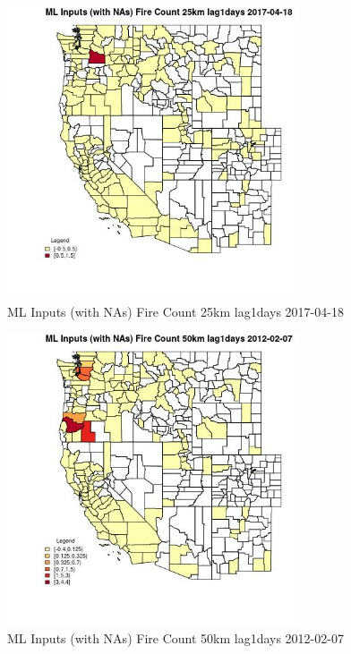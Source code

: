\begin{figure} 
\centering  
\includegraphics[width=0.77\textwidth]{Code_Outputs/Report_ML_input_PM25_Step4_part_f_de_duplicated_aves_prioritize_24hr_obswNAs_CountyFire_Count_25km_lag1daysMean2017-04-18.jpg} 
\caption{\label{fig:Report_ML_input_PM25_Step4_part_f_de_duplicated_aves_prioritize_24hr_obswNAsCountyFire_Count_25km_lag1daysMean2017-04-18}ML Inputs (with NAs) Fire Count 25km lag1days 2017-04-18} 
\end{figure} 
 

\clearpage 

\begin{figure} 
\centering  
\includegraphics[width=0.77\textwidth]{Code_Outputs/Report_ML_input_PM25_Step4_part_f_de_duplicated_aves_prioritize_24hr_obswNAs_CountyFire_Count_50km_lag1daysMean2012-02-07.jpg} 
\caption{\label{fig:Report_ML_input_PM25_Step4_part_f_de_duplicated_aves_prioritize_24hr_obswNAsCountyFire_Count_50km_lag1daysMean2012-02-07}ML Inputs (with NAs) Fire Count 50km lag1days 2012-02-07} 
\end{figure} 
 

